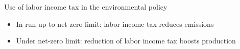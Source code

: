 \documentclass[11pt,aspectratio=169]{beamer}
\begin{document}
\begin{frame}{Use of labor income tax in the environmental policy}
\begin{figure}[h!!]
\begin{subfigure}{0.45\textwidth}
	\end{subfigure}
\end{figure}
\vspace{3mm}
\begin{block}{}
	\begin{itemize}
		\item In run-up to net-zero limit: labor income tax reduces emissions
		\item Under net-zero limit: reduction of labor income tax boosts production
	\end{itemize}
\end{block}	
\end{frame}

\end{document}
